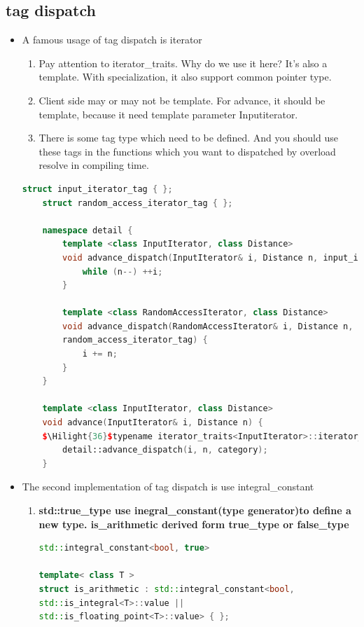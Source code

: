 \documentclass[a4paper,11pt,twoside]{book}
\newcommand{\Hilight}[1]{\makebox[0pt][l]{\color{yellow}\rule[-3pt]{#1em}{11pt}}}
\newcommand{\Hilight}[1]{}
\begin{document}
\subsection{tag dispatch}
\begin{itemize}
	\item A famous usage of tag dispatch is iterator 
	\begin{enumerate}
		\item Pay attention to iterator\_traits. Why do we use it here? It's also a template. With specialization, it also support common pointer type.
		
		\item Client side may or may not be template. For advance, it should be template, because it need template parameter Inputiterator.
		
		\item There is some tag type which need to be defined. And you should use these tags in the functions which you want to dispatched by overload resolve in compiling time. 
	\end{enumerate}
\begin{lstlisting}[frame=single, language=c++]
	struct input_iterator_tag { };
	struct random_access_iterator_tag { };
	
	namespace detail {
		template <class InputIterator, class Distance>
		void advance_dispatch(InputIterator& i, Distance n, input_iterator_tag) {
			while (n--) ++i;
		}
		
		template <class RandomAccessIterator, class Distance>
		void advance_dispatch(RandomAccessIterator& i, Distance n, 
		random_access_iterator_tag) {
			i += n;
		}
	}
	
	template <class InputIterator, class Distance>
	void advance(InputIterator& i, Distance n) {
	$\Hilight{36}$typename iterator_traits<InputIterator>::iterator_category category;
		detail::advance_dispatch(i, n, category);
	}
\end{lstlisting}
	
	\item The second implementation of tag dispatch is use integral\_constant
	\begin{enumerate}
		\item \textbf{std::true\_type use inegral\_constant(type generator)to define a new type. is\_arithmetic derived form true\_type or false\_type}
\begin{lstlisting}[frame=single, language=c++]
std::integral_constant<bool, true>
		
template< class T >
struct is_arithmetic : std::integral_constant<bool,
std::is_integral<T>::value ||
std::is_floating_point<T>::value> { };
\end{lstlisting}
		

\end{enumerate}
\end{itemize}
\end{document}
